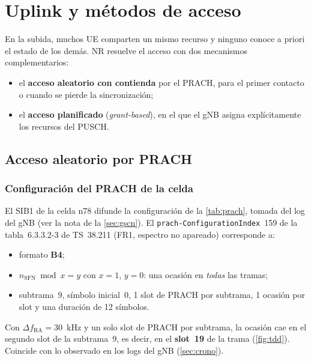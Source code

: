 \section{Uplink y métodos de acceso}\label{sec:ul}

En la subida, muchos UE comparten un mismo recurso y ninguno conoce a priori el estado de los demás. NR resuelve el acceso con dos mecanismos complementarios:
\begin{itemize}
  \item el \textbf{acceso aleatorio con contienda} por el PRACH, para el primer contacto o cuando se pierde la sincronización;
  \item el \textbf{acceso planificado} (\emph{grant-based}), en el que el gNB asigna explícitamente los recursos del PUSCH.
\end{itemize}

\subsection{Acceso aleatorio por PRACH}\label{sec:rach}
\subsubsection{Configuración del PRACH de la celda}
El SIB1 de la celda n78 difunde la configuración de la \cref{tab:prach}, tomada del log del gNB (ver la nota de la \cref{sec:gscn}). El \texttt{prach-ConfigurationIndex}~159 de la tabla~6.3.3.2-3 de TS~38.211 (FR1, espectro no apareado) corresponde a:
\begin{itemize}
  \item formato \textbf{B4};
  \item $n_\text{SFN}\bmod x = y$ con $x=1$, $y=0$: una ocasión en \emph{todas} las tramas;
  \item subtrama~9, símbolo inicial~0, 1 slot de PRACH por subtrama, 1 ocasión por slot y una duración de 12 símbolos.
\end{itemize}
Con $\Delta f_\text{RA}=30$~kHz y un solo slot de PRACH por subtrama, la ocasión cae en el segundo slot de la subtrama~9, es decir, en el \textbf{slot~19} de la trama (\cref{fig:tdd}). Coincide con lo observado en los logs del gNB (\cref{sec:crono}).

